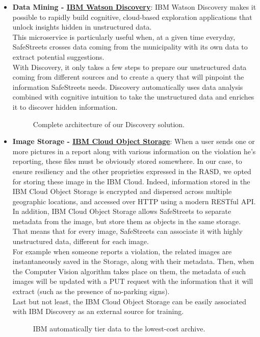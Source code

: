 \begin{itemize}
	\item \textbf{Data Mining - \href{https://cloud.ibm.com/catalog/services/discovery}{IBM Watson Discovery}}: IBM Watson Discovery makes it possible to rapidly build cognitive, cloud-based exploration applications that unlock insights hidden in unstructured data. 
	\\This microservice is particularly useful when, at a given time everyday, SafeStreets crosses data coming from the municipality with its own data to extract potential suggestions.
	\\With Discovery, it only takes a few steps to prepare our unstructured data coming from different sources and to create a query that will pinpoint the information SafeStreets needs. Discovery automatically uses data analysis combined with cognitive intuition to take the unstructured data and enriches it to discover hidden information.
	\begin{figure}[h!]
		\caption{Complete architecture of our Discovery solution.}
	\end{figure}
	\FloatBarrier
	
	\item \textbf{Image Storage - \href{https://cloud.ibm.com/catalog/services/cloud-object-storage}{IBM Cloud Object Storage}}: When a user sends one or more pictures in a report along with various information on the violation he's reporting, these files must be obviously stored somewhere. In our case, to ensure  resiliency and the other proprieties expressed in the RASD, we opted for storing these image in the IBM Cloud. Indeed, information stored in the IBM Cloud Object Storage is encrypted and dispersed across multiple geographic locations, and accessed over HTTP using a modern RESTful API.
	In addition, IBM Cloud Object Storage allows SafeStreets to separate metadata from the image, but store them as objects in the same storage. That means that for every image, SafeStreets can associate it with highly unstructured data, different for each image. 
	\\For example when someone reports a violation, the related images are instantaneously saved in the Storage, along with their metadata. Then, when the Computer Vision algorithm takes place on them, the metadata of such images will be updated with a PUT request with the information that it will extract (such as the presence of no-parking signs).
	\\Last but not least, the IBM Cloud Object Storage can be easily associated with IBM Discovery as an external source for training.
	\begin{figure}[h!]
		\caption{IBM automatically tier data to the lowest-cost archive.}
	\end{figure}
	\FloatBarrier
	

\end{itemize}
